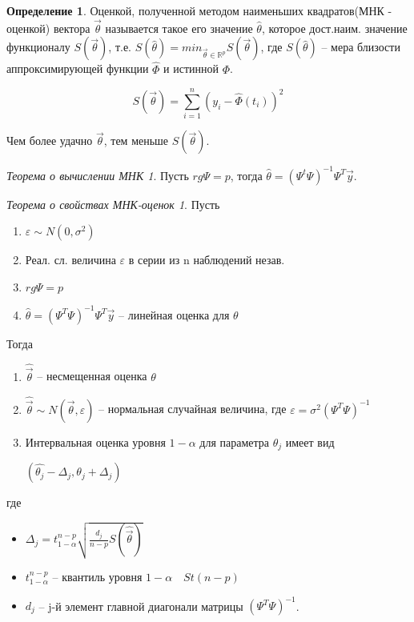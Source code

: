 \documentclass[a4paper, 12pt]{article}
\theoremstyle{definition}
\newtheorem{definition}{Определение}[section]
\theoremstyle{leads}
\theoremstyle{example}
\theoremstyle{remark}
\begin{document}
\begin{definition}
	Оценкой, полученной методом наименьших квадратов(МНК - оценкой) вектора $\vec{\theta}$ называется такое его значение $\hat{\theta}$, которое дост.наим. значение функционалу $S(\vec{\theta})$, т.е. $S(\hat{\theta}) = min_{\vec{\theta} \in \mathbb{R}^p} S(\vec{\theta})$, где $S(\hat{\theta})$ -- мера близости аппроксимирующей функции $\hat{\Phi}$ и истинной $\Phi$.
	
	\begin{equation*}
		S(\vec{\theta}) = \sum_{i=1}^{n}(y_i - \hat{\Phi}(t_i))^2
	\end{equation*}
	
	Чем более удачно $\vec{\theta}$, тем меньше $S(\vec{\theta})$.
\end{definition}

\newtheorem*{MNK}{Теорема о вычислении МНК}
\begin{MNK}
	Пусть $rg \Psi = p$, тогда $\hat{\theta} = (\Psi^t \Psi)^{-1} \Psi^T \vec{y}$.
\end{MNK}

\newtheorem*{MNK2}{Теорема о свойствах МНК-оценок}
\begin{MNK2}
	Пусть
	\begin{enumerate}
		\item $\varepsilon \sim N(0, \sigma^2)$
		\item Реал. сл. величина $\varepsilon$ в серии из n наблюдений незав.
		\item $rg \Psi = p$
		\item $\hat{\theta} = (\Psi^T \Psi)^{-1} \Psi^T\vec{y}$ -- линейная оценка для $\theta$
	\end{enumerate}

Тогда 
\begin{enumerate}
	\item $\hat{\vec{\theta}}$ -- несмещенная оценка $\theta$
	\item $\hat{\vec{\theta}} \sim N(\vec{\theta}, \varepsilon)$ -- нормальная случайная величина, где  $\varepsilon = \sigma^2(\Psi^T\Psi)^{-1}$
	\item  Интервальная оценка уровня $1 - \alpha$ для параметра $\theta_j$ имеет вид 
	\begin{center}
		\centering
		$(\hat{\theta_j} - \Delta_j, \hat{\theta_j} + \Delta_j)$
	\end{center} 
\end{enumerate}
где 
\begin{itemize}
	\item $\Delta_j = t_{1 - \alpha}^{n - p} \sqrt{\frac{d_j}{n - p} S(\hat{\vec{\theta}})}$
	\item $t_{1 - \alpha}^{n - p}$ -- квантиль уровня $1 - \alpha  \quad St(n-p)$
	\item $d_j$ -- j-й элемент главной диагонали матрицы $(\Psi^T\Psi)^{-1}$.
\end{itemize}
\end{MNK2}
\newpage
\end{document}
